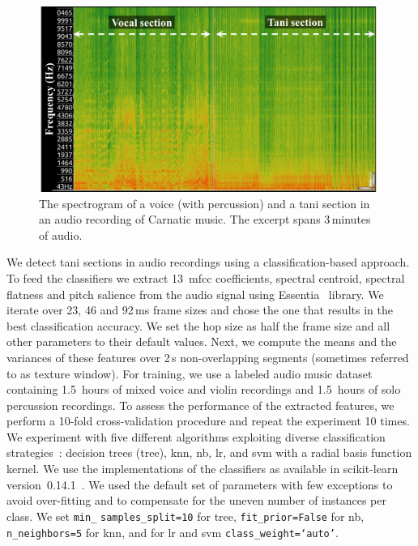{\begin{figure}
	\begin{center}
		\includegraphics[width=\figSizeEighty]{ch05_preprocessing/figures/spectrogramTani.png}
	\end{center}
	\caption[Illustration of the spectrogram a vocal and a \gls{tani} section]{The spectrogram of a voice (with percussion) and a \gls{tani} section in an audio recording of Carnatic music. The excerpt spans 3\,minutes of audio.}
	\label{fig:spectrogram_of_tani_segment}
\end{figure}

We detect \gls{tani} sections in audio recordings using a classification-based approach. To feed the classifiers we extract 13~\acrshort{mfcc} coefficients, spectral centroid, spectral flatness and pitch salience from the audio signal using Essentia~\citep{essentia} library. We iterate over 23, 46 and 92\,ms frame sizes and chose the one that results in the best classification accuracy. We set the hop size as half the frame size and all other parameters to their default values. Next, we compute the means and the variances of these features over 2\,s non-overlapping segments (sometimes referred to as texture window). For training, we use a labeled audio music dataset containing 1.5~hours of mixed voice and violin recordings and 1.5~hours of solo percussion recordings. To assess the performance of the extracted features, we perform a 10-fold cross-validation procedure and repeat the experiment 10 times. We experiment with five different algorithms exploiting diverse classification strategies~\citep{Hastie09BOOK}: decision trees (\acrshort{tree}), \gls{knn}, \gls{nb}, \gls{lr}, and \gls{svm} with a radial basis function kernel. We use the implementations of the classifiers as available in scikit-learn version~0.14.1~\citep{scikitlearn}. We used the default set of parameters with few exceptions to avoid over-fitting and to compensate for the uneven number of instances per class. We set \texttt{min\_} \texttt{samples\_split=10} for \acrshort{tree}, \texttt{fit\_prior=False} for \gls{nb}, \texttt{n\_neighbors=5} for \gls{knn}, and for \gls{lr} and \gls{svm} \texttt{class\_weight=`auto'}. 

}
